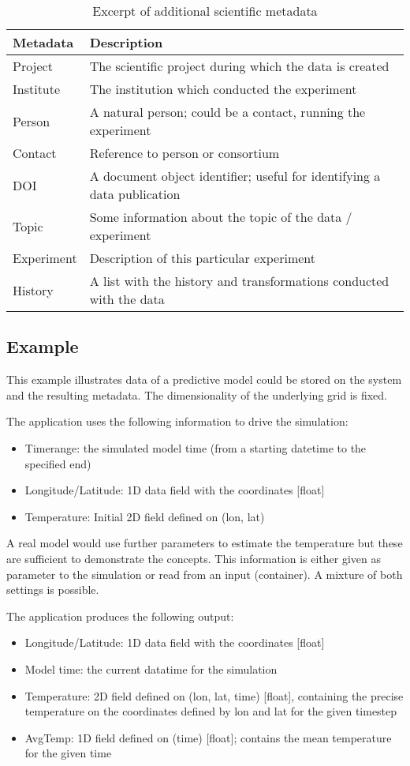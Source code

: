 \begin{table}
\begin{tabular}{ll}
Metadata & Description\\
\hline
Project & The scientific project during which the data is created \\
Institute & The institution which conducted the experiment\\
Person &  A natural person; could be a contact, running the experiment \\
Contact & Reference to person or consortium \\
DOI      & A document object identifier; useful for identifying a data publication\\
Topic     & Some information about the topic of the data / experiment \\
Experiment & Description of this particular experiment \\
History & A list with the history and transformations conducted with the data \\
\end{tabular}
\caption{Excerpt of additional scientific metadata}
\label{tbl:additionalMetadata}
\end{table}



\subsection{Example}

This example illustrates data of a predictive model could be stored on the system and the resulting metadata.
The dimensionality of the underlying grid is fixed.

The application uses the following information to drive the simulation:
\begin{itemize}
	\item Timerange: the simulated model time (from a starting datetime to the specified end)
	\item Longitude/Latitude: 1D data field with the coordinates [float]
	\item Temperature: Initial 2D field defined on (lon, lat)
\end{itemize}
A real model would use further parameters to estimate the temperature but these are sufficient to demonstrate the concepts.
This information is either given as parameter to the simulation or read from an input (container).
A mixture of both settings is possible.


The application produces the following output:
\begin{itemize}
	\item Longitude/Latitude: 1D data field with the coordinates [float]
	\item Model time: the current datatime for the simulation
	\item Temperature: 2D field defined on (lon, lat, time) [float], containing the precise temperature on the coordinates defined by lon and lat for the given timestep
	\item AvgTemp: 1D field defined on (time) [float]; contains the mean temperature for the given time
\end{itemize}

